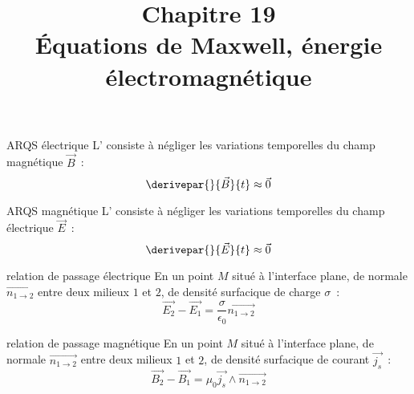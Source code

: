 

\setcounter{chapitre}{19}

\title{\Large Chapitre 19 \\ \Huge Équations de Maxwell, énergie électromagnétique}



\maketitle

\begin{definition}{}{ARQS électrique}
    L' consiste à négliger les variations temporelles du champ magnétique $\vec{B}$~:
    $$\derivepar{}{\vec{B}}{t} \approx \vec{0}$$
\end{definition}

\begin{definition}{}{ARQS magnétique}
    L' consiste à négliger les variations temporelles du champ électrique $\vec{E}$~:
    $$\derivepar{}{\vec{E}}{t} \approx \vec{0}$$
\end{definition}

\begin{theoreme}{}{relation de passage électrique}
    En un point $M$ situé à l'interface plane, de normale $\vec{n_{1\to 2}}$ entre deux milieux $1$ et $2$, de densité surfacique de charge $\sigma$~:
    $$\vec{E_2} - \vec{E_1} = \frac{\sigma}{\epsilon_0} \vec{n_{1\to 2}}$$
\end{theoreme}

\begin{theoreme}{}{relation de passage magnétique}
    En un point $M$ situé à l'interface plane, de normale $\vec{n_{1\to 2}}$ entre deux milieux $1$ et $2$, de densité surfacique de courant $\vec{j_s}$~:
    $$\vec{B_2} - \vec{B_1} = \mu_0 \vec{j_s} \wedge \vec{n_{1\to 2}}$$
\end{theoreme}

